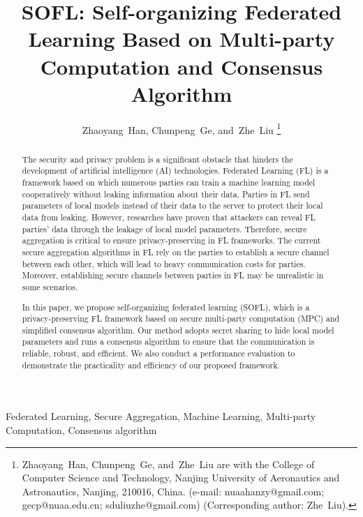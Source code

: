 \documentclass[journal]{IEEEtran}
\begin{document}
\title {SOFL: Self-organizing Federated Learning Based on Multi-party Computation and Consensus Algorithm}

\author{Zhaoyang~Han,
        Chunpeng~Ge,
        and~Zhe~Liu%
\thanks{Zhaoyang~Han, Chunpeng~Ge, and~Zhe~Liu are with the College of Computer Science and Technology, Nanjing University of Aeronautics and Astronautics, Nanjing, 210016, China. (e-mail: nuaahanzy@gmail.com; gecp@nuaa.edu.cn; sduliuzhe@gmail.com) (Corresponding author: Zhe~Liu).}
}

\maketitle

\begin{abstract}
The security and privacy problem is a significant obstacle that hinders the development of artificial intelligence (AI) technologies. Federated Learning (FL) is a framework based on which numerous parties can train a machine learning model cooperatively without leaking information about their data. Parties in FL send parameters of local models instead of their data to the server to protect their local data from leaking. However, researches have proven that attackers can reveal FL parties' data through the leakage of local model parameters. Therefore, secure aggregation is critical to ensure privacy-preserving in FL frameworks. The current secure aggregation algorithms in FL rely on the parties to establish a secure channel between each other, which will lead to heavy communication costs for parties. Moreover, establishing secure channels between parties in FL may be unrealistic in some scenarios.

In this paper, we propose self-organizing federated learning (SOFL), which is a privacy-preserving FL framework based on secure multi-party computation (MPC) and simplified consensus algorithm. Our method adopts secret sharing to hide local model parameters and runs a consensus algorithm to ensure that the communication is reliable, robust, and efficient. We also conduct a performance evaluation to demonstrate the practicality and efficiency of our proposed framework. 

\end{abstract}

\begin{IEEEkeywords}
    Federated Learning, Secure Aggregation, Machine Learning, Multi-party Computation, Consensus algorithm
\end{IEEEkeywords}
\end{document}
